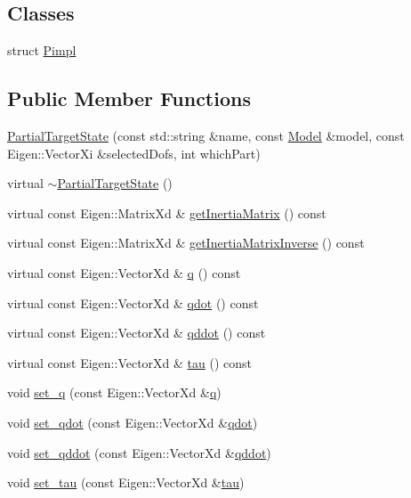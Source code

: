 \subsection*{Classes}
\begin{DoxyCompactItemize}
\item 
struct \hyperlink{structocra_1_1PartialTargetState_1_1Pimpl}{Pimpl}
\end{DoxyCompactItemize}
\subsection*{Public Member Functions}
\begin{DoxyCompactItemize}
\item 
\hyperlink{classocra_1_1PartialTargetState_a2aed8d7e02fa12907eb218449afc6422}{Partial\+Target\+State} (const std\+::string \&name, const \hyperlink{classocra_1_1Model}{Model} \&model, const Eigen\+::\+Vector\+Xi \&selected\+Dofs, int which\+Part)
\item 
virtual \hyperlink{classocra_1_1PartialTargetState_a32d63501a917b40728387258cb1e06d1}{$\sim$\+Partial\+Target\+State} ()
\item 
virtual const Eigen\+::\+Matrix\+Xd \& \hyperlink{classocra_1_1PartialTargetState_a757cd49fca47e934025e92b81dc15535}{get\+Inertia\+Matrix} () const
\item 
virtual const Eigen\+::\+Matrix\+Xd \& \hyperlink{classocra_1_1PartialTargetState_a0e6f90f112e0a54384eb99dd7def49e0}{get\+Inertia\+Matrix\+Inverse} () const
\item 
virtual const Eigen\+::\+Vector\+Xd \& \hyperlink{classocra_1_1PartialTargetState_af953d48bac74ff93ed79d4c75bde207f}{q} () const
\item 
virtual const Eigen\+::\+Vector\+Xd \& \hyperlink{classocra_1_1PartialTargetState_a9442a4f1c0827a20b6d6582dcceff88a}{qdot} () const
\item 
virtual const Eigen\+::\+Vector\+Xd \& \hyperlink{classocra_1_1PartialTargetState_a450c270ee9583ad7cde6a91630045792}{qddot} () const
\item 
virtual const Eigen\+::\+Vector\+Xd \& \hyperlink{classocra_1_1PartialTargetState_ac76855da54cf77b63bdbd7ecdb6ef57d}{tau} () const
\item 
void \hyperlink{classocra_1_1PartialTargetState_aa1cf1348c8e9880897df5f7f925dcac5}{set\+\_\+q} (const Eigen\+::\+Vector\+Xd \&\hyperlink{classocra_1_1PartialTargetState_af953d48bac74ff93ed79d4c75bde207f}{q})
\item 
void \hyperlink{classocra_1_1PartialTargetState_af04d90592c43ee69ed14e212e7fa2f47}{set\+\_\+qdot} (const Eigen\+::\+Vector\+Xd \&\hyperlink{classocra_1_1PartialTargetState_a9442a4f1c0827a20b6d6582dcceff88a}{qdot})
\item 
void \hyperlink{classocra_1_1PartialTargetState_a4acfcf9b591e296d56c91e00bdbd2a69}{set\+\_\+qddot} (const Eigen\+::\+Vector\+Xd \&\hyperlink{classocra_1_1PartialTargetState_a450c270ee9583ad7cde6a91630045792}{qddot})
\item 
void \hyperlink{classocra_1_1PartialTargetState_a3c58ea195fb95e9a5a5e7a00939f955d}{set\+\_\+tau} (const Eigen\+::\+Vector\+Xd \&\hyperlink{classocra_1_1PartialTargetState_ac76855da54cf77b63bdbd7ecdb6ef57d}{tau})
\end{DoxyCompactItemize}
